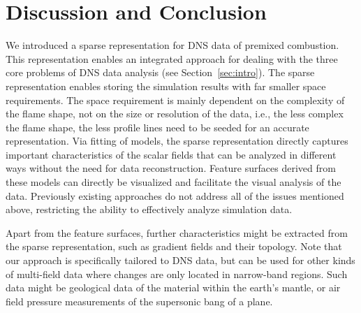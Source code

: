 
%
\section{Discussion and Conclusion}
\label{sec:conclusion}
%
We introduced a sparse representation for \ac{DNS} data of premixed combustion. This
representation enables an integrated approach for dealing with the three core
problems of \ac{DNS} data analysis (see Section~\ref{sec:intro}). The sparse
representation enables storing the simulation results with far smaller space
requirements. The space requirement is mainly dependent on the complexity of the
flame shape, not on the size or resolution of the data, i.e., the less complex
the flame shape, the less profile lines need to be seeded for an accurate
representation. Via fitting of models, the sparse representation directly
captures important characteristics of the scalar fields that can be analyzed in
different ways without the need for data reconstruction. Feature surfaces
derived from these models can directly be visualized and facilitate the visual
analysis of the data. Previously existing approaches do not address all of the
issues mentioned above, restricting the ability to effectively analyze
simulation data.


Apart from the feature surfaces, further characteristics might be extracted from
the sparse representation, such as gradient fields and their topology.
Note that our approach is specifically tailored to \ac{DNS} data, but can be used
for other kinds of multi-field data where changes are only located in 
narrow-band regions. Such data might be geological data of the material within
the earth's mantle, or air field pressure measurements of the supersonic bang of
a plane.

